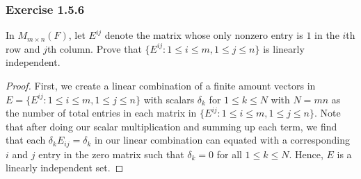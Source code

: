 \subsubsection{Exercise 1.5.6} In \( M_{m \times n}(F) \), let \( E^{ij}  \) denote the matrix whose only nonzero entry is \( 1  \) in the \( i \)th row and \( j \)th column. Prove that 
\( \{ E^{ij} : 1 \leq i \leq m , 1 \leq j \leq n  \}  \) is linearly independent.
\begin{proof}
    First, we create a  linear combination of a finite amount vectors in \( E  = \{ E^{ij} : 1 \leq i  \leq m , 1 \leq j \leq n   \}  \) with scalars \( \delta_{k}  \) for \( 1 \leq k \leq N  \) with \( N = mn \) as the number of total entries in each matrix in \( \{ E^{ij} : 1 \leq i \leq m , 1 \leq j \leq n  \}  \). Note that after doing our scalar multiplication and summing up each term, we find that each  \( \delta_{k} E_{ij} = \delta_{k}   \) in our linear combination can equated with a corresponding \( i  \) and  \( j  \) entry in the zero matrix such that \( \delta_{k} =  0  \) for all \( 1 \leq k \leq N  \). Hence, \( E  \) is a linearly independent set.
\end{proof}

